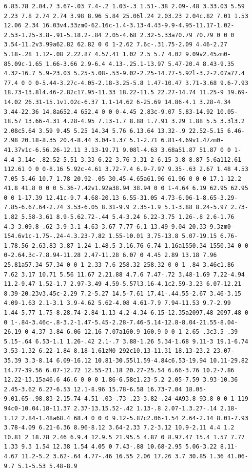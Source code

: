 \documentclass[11pt]{article}
\begin{document}
\begin{enumerate}
\begin{verbatim}
6.83.78 2.04.7 3.67-.03 7.4-.2 1.03-.3 1.51-.38 2.09-.48 3.33.03 5.59 2.23 7.8 2.74 2.74 3.98 8.96 5.84 25.06l.24 2.03.23 2.04c.82 7.01 1.53 12.06 2.34 16.03v4.33zm0-62.16c-1.4-3.13-4.43-9.9-4.95-11.17-1.02-2.53-1.25-3.8-.91-5.18.2-.84 2.05-4.68 2.32-5.33a70.79 70.79 0 0 0 3.54-11.2v3.99a62.82 62.82 0 0 1-2.62 7.6c-.31.75-2.09 4.46-2.27 5.18-.28 1.12-.08 2.22.87 4.57.41 1.02 2.5 5.7 4.02 9.09v2.45zm0-85.09c-1.65 1.66-3.66 2.9-6.4 4.13-.25.1-13.97 5.47-20.4 8.43-9.35 4.32-16.7 5.9-23.03 5.25-5.08-.53-9.02-2.25-14.77-5.92l-3.2-2.07a77.4 77.4 0 0 0-5.44-3.27c-4.05-2.18-3.25-5.8 1.47-10.47 3.71-3.68 9.6-7.93 18.73-13.8l4.46-2.82c17.95-11.33 18.22-11.5 22.27-14.74 11.25-9 19.69-14.02 26.31-15.1v1.02c-6.37 1.1-14.62 6-25.69 14.86-4.1 3.28-4.34 3.44-22.36 14.8a652.4 652.4 0 0 0-4.45 2.83c-9.07 5.83-14.92 10.05-18.57 13.66-4.31 4.28-4.95 7.13-1.7 8.88 1.7.91 3.29 1.88 5.5 3.3l3.2 2.08c5.64 3.59 9.45 5.25 14.34 5.76 6.13.64 13.32-.9 22.52-5.15 6.46-2.98 20.18-8.35 20.4-8.44 3.04-1.37 5.1-2.71 6.81-4.69v1.47zm0-41.37v1c-6.56.26-12.11 3.13-19.71 9.08l-4.63 3.68a51.87 51.87 0 0 1-4.4 3.14c-.82.52-5.51 3.33-6.22 3.76-3.31 2-6.15 3.8-8.87 5.6a112.61 112.61 0 0 0-8.16 5.92c-4.61 3.72-7.4 6.9-7.97 9.35-.63 2.67 1.48 4.53 7.05 5.46 10.7 1.78 20.92-.05 30.45-4.65a61.96 61.96 0 0 0 17.1-12.2 41.8 41.8 0 0 0 5.36-7.42v1.92a38.94 38.94 0 0 1-4.64 6.19 62.95 62.95 0 0 1-17.39 12.41c-9.7 4.68-20.13 6.55-31.05 4.73-6.06-1-8.65-3.29-7.85-6.67.64-2.74 3.53-6.05 8.31-9.9 2.35-1.9 5.1-3.88 8.24-5.97 2.73-1.82 5.58-3.61 8.9-5.62.72-.44 5.4-3.24 6.22-3.75 1.26-.8 2.6-1.76 4.3-3.09.8-.62 3.9-3.1 4.63-3.67 7.77-6.1 13.49-9.04 20.33-9.3zm0-154.6v1c-1.75-.24-4.3.23-7.82 1.55-10.01 3.75-13.8 5.07-19.15 6.76-1.78.56-2.63.83-3.87 1.24-1.48.5-3.16.76-6.74 1.16a1550.34 1550.34 0 0 0-2.64.3c-7.8.94-11.28 2.47-11.28 6.07 0 4.45 2.89 13.18 7.96 25.81a57.34 57.34 0 0 1 2.33 7.6 258.32 258.32 0 0 1 .84 3.46c1.86 7.62 3.17 10.71 5.56 11.67 2.21.88 4.7.6 7.47-.72 3.48-1.69 7.22-4.94 11.2-9.47 1.52-1.7 2.97-3.49 4.59-5.57l3.16-4.1c2.59-3.23 6.07-12.21 8.39-20.23v3.45c-2.29 7.2-5.27 14.5-7.61 17.41-.44.55-2.67 3.46-3.15 4.09-1.63 2.1-3.1 3.9-4.62 5.62-4.08 4.61-7.9 7.94-11.53 9.7-2.99 1.44-5.77 1.75-8.28.74-2.84-1.13-4.2-4.34-6.15-12.35a2097.48 2097.48 0 0 1-.84-3.46c-.8-3.2-1.47-5.45-2.28-7.46-5.14-12.8-8.04-21.55-8.04-26.19 0-4.37 3.84-6.06 12.16-7.07a160.9 160.9 0 0 1 2.65-.3c3.5-.39 5.15-.64 6.53-1.1 1.26-.42 2.1-.7 3.88-1.26 5.34-1.68 9.11-3 19.1-6.74 3.53-1.32 6.22-1.84 8.18-1.61zM0 292c10.13-11.31 18.13-23.2 23.07-35.39 3.3-8.14 6.09-16.12 10.81-30.55l1.59-4.84c6.53-19.94 10.11-29.82 14.77-39.56 6.07-12.72 12.55-21.18 20.27-25.54 6.66-3.76 10.2-7.86 12.22-13.15a46.6 46.6 0 0 0 1.86-6.58c1.23-5.2 2.05-7.59 3.93-10.36 2.45-3.62 6.27-6.53 12.1-8.96 15.78-6.58 16.73-7.04 18.05-9.01.65-.98.83-2.15.74-4.51-.03-.73-.23-3.82-.24-4A93.8 93.8 0 0 1 119 94c0-10.04.18-11.37 2.37-13.15.52-.42 1.13-.8 2.07-1.3.27-.14 2.18-1.12 2.84-1.48a68.4 68.4 0 0 0 9.12-5.87c2.06-1.54 2.64-2.14 8.01-7.93 3.78-4.09 6.21-6.36 8.96-8.12 3.64-2.33 7.2-3.12 10.9-2.11 4.4 1.2 10.81 2 18.78 2.46 6.9.4 12.9.5 21.95.5 4.87 0 8.97.47 15.4 1.57 7.77 1.33 9.3 1.54 12.38 1.54 4.05 0 7.43-.88 10.68-2.95 5.06-3.22 8.11-4.67 11.2-5.2 3.62-.64 4.77-.46 16.55 2.06 17.26 3.7 30.85 1.36 41.06-9.7 5.1-5.53 5.48-8.9 
\end{verbatim}
\end{enumerate}
\end{document}
